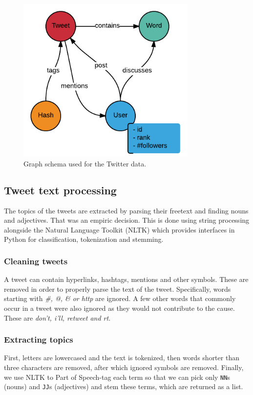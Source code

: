 \begin{figure}[t]
\centering
\includegraphics[width=3.5in,natwidth=440,natheight=409]{images/Schema.png}
\caption{Graph schema used for the Twitter data.}
\label{fig:schema}
\end{figure}

\subsection{Tweet text processing}

The topics of the tweets are extracted by parsing their freetext and
finding nouns and adjectives. That was an empiric decision. This is done 
using string processing alongside the Natural Language Toolkit (NLTK) 
\cite{bird2006nltk} which provides interfaces in Python for classification, 
tokenization and stemming.

\subsubsection{Cleaning tweets}

A tweet can contain hyperlinks, hashtags, mentions and other symbols. These are
removed in order to properly parse the text of the tweet. Specifically, words
starting with \textit{\#, @, \& or http} are ignored. A few other words that
commonly occur in a tweet were also ignored as they would not contribute to the
cause. These are \textit{don't, i'll, retweet and rt}.

\subsubsection{Extracting topics}

First, letters are lowercased and the text is tokenized, then words shorter than
three characters are removed, after which ignored symbols are removed. Finally,
we use NLTK to Part of Speech-tag \cite{pos} each term so that we can pick only
\texttt{NN}s (nouns) and \texttt{JJ}s (adjectives) and stem these terms, which are
returned as a list.

